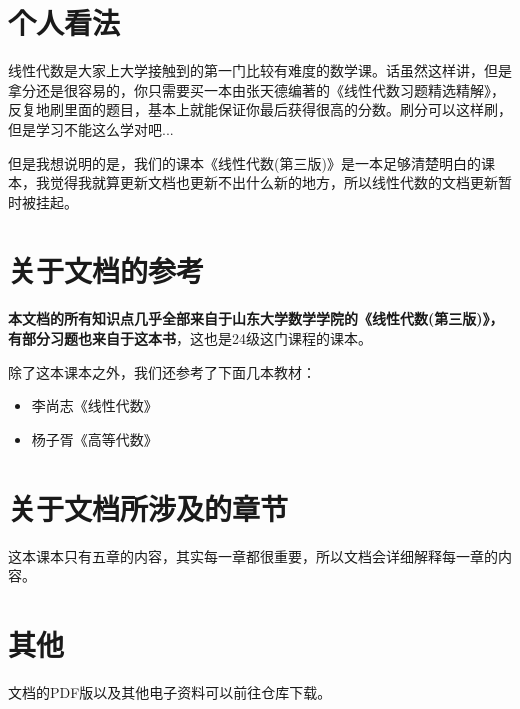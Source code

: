 \documentclass[12pt, a4paper, oneside]{ctexart}
\begin{document}
\section*{个人看法}

线性代数是大家上大学接触到的第一门比较有难度的数学课。话虽然这样讲，但是拿分还是很容易的，你只需要买一本由张天德编著的《线性代数习题精选精解》，反复地刷里面的题目，基本上就能保证你最后获得很高的分数。刷分可以这样刷，但是学习不能这么学对吧...

但是我想说明的是，我们的课本《线性代数(第三版)》是一本足够清楚明白的课本，我觉得我就算更新文档也更新不出什么新的地方，所以线性代数的文档更新暂时被挂起。

\section*{关于文档的参考}

\textbf{本文档的所有知识点几乎全部来自于山东大学数学学院的《线性代数(第三版)》，有部分习题也来自于这本书}，这也是24级这门课程的课本。

除了这本课本之外，我们还参考了下面几本教材：
\begin{itemize}
    \item 李尚志《线性代数》
    \item 杨子胥《高等代数》
\end{itemize}

\section*{关于文档所涉及的章节}

这本课本只有五章的内容，其实每一章都很重要，所以文档会详细解释每一章的内容。

\section*{其他}

文档的PDF版以及其他电子资料可以前往仓库下载。
\end{document}
